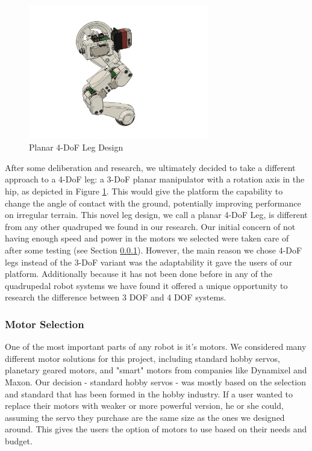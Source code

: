                      \begin{figure}[H]
                        \centering
                        \includegraphics[width=0.7\textwidth]{figures/4dof.png}
                        \caption{Planar 4-DoF Leg Design}
                        \label{fig:Planar4DoF}
                    \end{figure}

                After some deliberation and research, we ultimately decided to take a different approach to a 4-DoF leg: a 3-DoF planar manipulator with a rotation axis in the hip, as depicted in Figure \ref{fig:Planar4DoF}. This would give the platform the capability to change the angle of contact with the ground, potentially improving performance on irregular terrain. This novel leg design, we call a planar 4-DoF Leg, is different from any other quadruped we found in our research. Our initial concern of not having enough speed and power in the motors we selected were taken care of after some testing (see Section \ref{subsubsec:MotorSelection}). However, the main reason we chose 4-DoF legs instead of the 3-DoF variant was the adaptability it gave the users of our platform. Additionally because it has not been done before in any of the quadrupedal robot systems we have found it offered a unique opportunity to research the difference between 3 DOF and 4 DOF systems. 
                
\subsubsection{Motor Selection}\label{subsubsec:MotorSelection}
        One of the most important parts of any robot is it's motors. We considered many different motor solutions for this project, including standard hobby servos, planetary geared motors, and "smart" motors from companies like Dynamixel and Maxon. Our decision - standard hobby servos - was mostly based on the selection and standard that has been formed in the hobby industry. If a user wanted to replace their motors with weaker or more powerful version, he or she could, assuming the servo they purchase are the same size as the ones we designed around. This gives the users the option of motors to use based on their needs and budget. 
        
